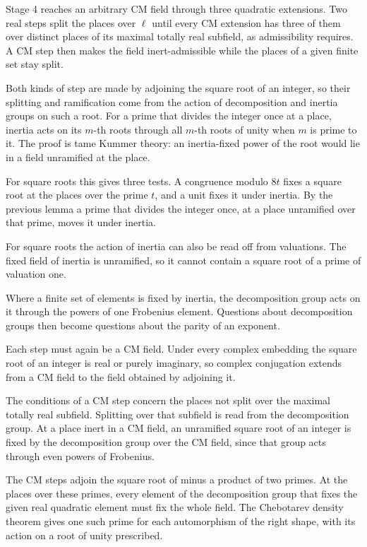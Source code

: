 Stage 4 reaches an arbitrary CM field through three quadratic extensions. Two real steps split the
places over $\ell$ until every CM extension has three of them over distinct places of its maximal
totally real subfield, as admissibility requires. A CM step then makes the field inert-admissible while
the places of a given finite set stay split.

Both kinds of step are made by adjoining the square root of an integer, so their splitting and
ramification come from the action of decomposition and inertia groups on such a root. For a prime that
divides the integer once at a place, inertia acts on its $m$-th roots through all $m$-th roots of unity
when $m$ is prime to it. The proof is tame Kummer theory: an inertia-fixed power of the root would lie in
a field unramified at the place.

For square roots this gives three tests. A congruence modulo $8t$ fixes a square root at the places over
the prime $t$, and a unit fixes it under inertia. By the previous lemma a prime that divides the integer
once, at a place unramified over that prime, moves it under inertia.

For square roots the action of inertia can also be read off from valuations. The fixed field of inertia
is unramified, so it cannot contain a square root of a prime of valuation one.

Where a finite set of elements is fixed by inertia, the decomposition group acts on it through the
powers of one Frobenius element. Questions about decomposition groups then become questions about the
parity of an exponent.

Each step must again be a CM field. Under every complex embedding the square root of an integer is real
or purely imaginary, so complex conjugation extends from a CM field to the field obtained by adjoining
it.

The conditions of a CM step concern the places not split over the maximal totally real subfield.
Splitting over that subfield is read from the decomposition group. At a place inert in a CM field, an
unramified square root of an integer is fixed by the decomposition group over the CM field, since that
group acts through even powers of Frobenius.

The CM steps adjoin the square root of minus a product of two primes. At the places over these primes,
every element of the decomposition group that fixes the given real quadratic element must fix the whole
field. The Chebotarev density theorem gives one such prime for each automorphism of the right shape,
with its action on a root of unity prescribed.

